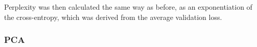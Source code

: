 \documentclass[12pt,a4paper]{article}
\numberwithin{figure}{section}
\numberwithin{table}{section}
\numberwithin{definition}{section}
\begin{document}
Perplexity was then calculated the same way as before, as an exponentiation of the cross-entropy, which was derived from the average validation loss.





\subsubsection{PCA}
\label{ssec:pca}

\end{document}
